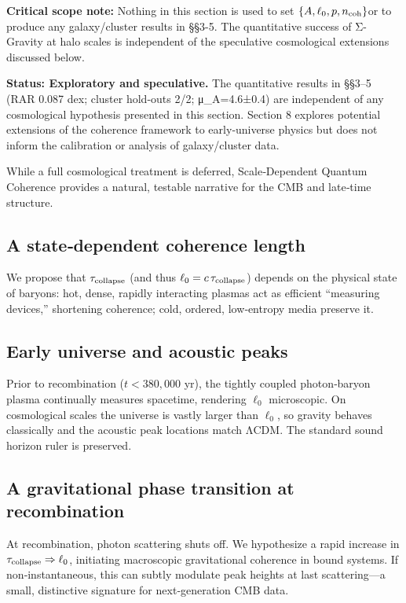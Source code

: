 \documentclass[11pt,a4paper]{article}
\begin{document}
\textbf{Critical scope note:} Nothing in this section is used to set $\allowbreak \{A, \ell_0, p, n_{\rm coh}\}$\allowbreak  or to produce any galaxy/cluster results in §§3-5. The quantitative success of Σ-Gravity at halo scales is independent of the speculative cosmological extensions discussed below.


\textbf{Status: Exploratory and speculative.} The quantitative results in §§3–5 (RAR 0.087 dex; cluster hold-outs 2/2; μ\_A=4.6±0.4) are independent of any cosmological hypothesis presented in this section. Section 8 explores potential extensions of the coherence framework to early‑universe physics but does not inform the calibration or analysis of galaxy/cluster data.


While a full cosmological treatment is deferred, Scale‑Dependent Quantum Coherence provides a natural, testable narrative for the CMB and late‑time structure.


\subsection{A state‑dependent coherence length}


We propose that $\tau_{\rm collapse}$ (and thus $\allowbreak \ell_0=c\,\tau_{\rm collapse}$\allowbreak ) depends on the physical state of baryons: hot, dense, rapidly interacting plasmas act as efficient “measuring devices,” shortening coherence; cold, ordered, low‑entropy media preserve it.


\subsection{Early universe and acoustic peaks}


Prior to recombination ($t<380{,}000$ yr), the tightly coupled photon‑baryon plasma continually measures spacetime, rendering $\ell_0$ microscopic. On cosmological scales the universe is vastly larger than $\ell_0$, so gravity behaves classically and the acoustic peak locations match ΛCDM. The standard sound horizon ruler is preserved.


\subsection{A gravitational phase transition at recombination}


At recombination, photon scattering shuts off. We hypothesize a rapid increase in $\allowbreak \tau_{\rm collapse}\Rightarrow\ell_0$\allowbreak , initiating macroscopic gravitational coherence in bound systems. If non‑instantaneous, this can subtly modulate peak heights at last scattering—a small, distinctive signature for next‑generation CMB data.
\end{document}
